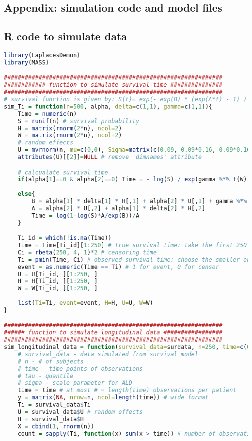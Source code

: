 \begin{appendices}
\section{Appendix: simulation code and model files}
\subsection{R code to simulate data}
\begin{lstlisting}[language=R]
library(LaplacesDemon)
library(MASS)

###############################################################
############ function to simulate survival time ###############
###############################################################
# survival function is given by: S(t)= exp(- exp(B) * (exp(A*t) - 1) ) / A)
sim_Ti = function(n=500, alpha, delta=c(1,1), gamma=c(1,1)){
	Time = numeric(n)
	S = runif(n) # survival probability
	H = matrix(rnorm(2*n), ncol=2)
	W = matrix(rnorm(2*n), ncol=2)
	# random effects
	U = mvrnorm(n, mu=c(0,0), Sigma=matrix(c(0.09, 0.09*0.16, 0.09*0.16, 0.09), nrow=2, byrow=T))
	attributes(U)[[2]]=NULL # remove 'dimnames' attribute

	# calcualate survival time
	if(alpha[1]==0 & alpha[2]==0) Time = - log(S) / exp(gamma %*% t(W))
	
	else{
		B = alpha[1] * delta[1] * H[,1] + alpha[2] * U[,1] + gamma %*% t(W)
		A = alpha[2] * U[,2] + alpha[1] * delta[2] * H[,2]
		Time = log(1-log(S)*A/exp(B))/A 
	}

	Ti_id = which(!is.na(Time))
	Time = Time[Ti_id][1:250] # true survival time: take the first 250 that are not NA
	Ci = rbeta(250, 4, 1)*2 # censoring time
	Ti = pmin(Time, Ci) # observed survival time: choose the smaller one
	event = as.numeric(Time == Ti) # 1 for event, 0 for censor
	U = U[Ti_id, ][1:250, ]
	H = H[Ti_id, ][1:250, ]
	W = W[Ti_id, ][1:250, ]
		
	list(Ti=Ti, event=event, H=H, U=U, W=W)	
}

###############################################################
###### function to simulate longitudinal data #################
###############################################################
sim_longitudinal_data = function(survival_data=surdata, n=250, time=c(0, 0.25, 0.5, 0.75, 1, 3), tau, sigma=1, beta=c(1,1), delta=c(1,1)){
	# survival_data - data simulated from survival model
	# n - # of subjects
	# time - time points of observations
	# tau - quantile
	# sigma - scale parameter for ALD
	time = time # at most # = length(time) observations per patient
	y = matrix(NA, nrow=n, ncol=length(time)) # wide format
	Ti = survival_data$Ti
	U = survival_data$U # random effects
	H = survival_data$H
	X = cbind(1, rnorm(n))
	count = sapply(Ti, function(x) sum(x > time)) # number of observations after drop-outs


\end{lstlisting}
\end{appendices}
